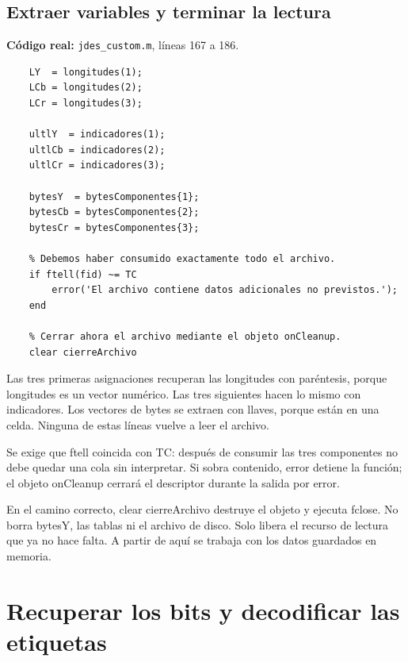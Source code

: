 \documentclass[11pt,a4paper,oneside]{report}
\begin{document}
\par\medskip\noindent\begin{minipage}{\linewidth}

\subsection{Extraer variables y terminar la lectura}

\textbf{Código real:} \texttt{jdes\_custom.m}, líneas 167 a 186.

\begin{lstlisting}[firstnumber=167]
    % Recuperar las variables de cada componente.
    LY  = longitudes(1);
    LCb = longitudes(2);
    LCr = longitudes(3);

    ultlY  = indicadores(1);
    ultlCb = indicadores(2);
    ultlCr = indicadores(3);

    bytesY  = bytesComponentes{1};
    bytesCb = bytesComponentes{2};
    bytesCr = bytesComponentes{3};

    % Debemos haber consumido exactamente todo el archivo.
    if ftell(fid) ~= TC
        error('El archivo contiene datos adicionales no previstos.');
    end

    % Cerrar ahora el archivo mediante el objeto onCleanup.
    clear cierreArchivo
\end{lstlisting}

\end{minipage}\par


Las tres primeras asignaciones recuperan las longitudes con paréntesis,
porque longitudes es un vector numérico. Las tres siguientes hacen lo mismo
con indicadores. Los vectores de bytes se extraen con llaves, porque están
en una celda. Ninguna de estas líneas vuelve a leer el archivo.

Se exige que ftell coincida con TC: después de consumir las tres componentes
no debe quedar una cola sin interpretar. Si sobra contenido, error detiene
la función; el objeto onCleanup cerrará el descriptor durante la salida por error.

En el camino correcto, clear cierreArchivo destruye el objeto y ejecuta
fclose. No borra bytesY, las tablas ni el archivo de disco. Solo libera el
recurso de lectura que ya no hace falta. A partir de aquí se trabaja con
los datos guardados en memoria.


\section{Recuperar los bits y decodificar las etiquetas}
\end{document}
